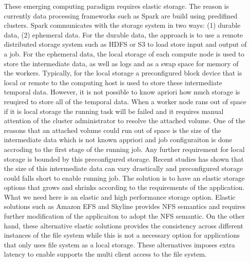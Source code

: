 These emerging computing paradigm requires elastic storage. 
The reason is currently data processing frameworks such as Spark are build using predifined clusters. 
Spark communicates with the storage system in two ways: (1) durable data, (2) ephemeral data. 
For the durable data, the approach is to use a remote distributed storage system such as HDFS or S3 to load store input and output of a job.
For the ephemeral data, the local storage of each compute node is used to store the intermediate data, as well as logs and as a swap space for memory of the workers. 
Typically, for the local storage a preconfigured block device that is local or remote to the computing host is used to store these intermediate temporal data.
However, it is not possible to know apriori how much storage is reuqired to store all of the temporal data. 
When a worker node rans out of space if it is local storage the running task will be failed and it requires manual attention of the cluster administrator to resolve the attached volume. 
One of the reasons that an attached volume could run out of space is the size of the intermediate data which is not known appriori and job configuraiton is done accroding to the first stage of the running job. 
Any further requirement for local storage is bounded by this preconfigured storage. 
Recent studies has shown that the size of this intermediate data can vary drastically and preconfigured storage could falls short to enable running job. 
The solution is to have an elastic storage options that grows and shrinks according to the requirements of the application. 
What we need here is an elastic and high performance storage option. 
Elastic solutions such as Amazon EFS and Skyline provides NFS semantics and requires further modification of the applicaiton to adopt the NFS semantic. 
On the other hand, these alternative elastic solutions provides the consistency across different instances of the file system while this is not a necessary option for applications that only uses file system as a local storage. 
These alternatives imposes extra latency to enable supports the multi client access to the file system.

